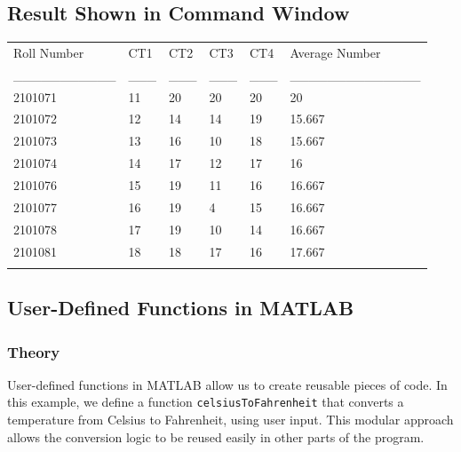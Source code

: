 \documentclass[a4paper,12pt]{article}
\begin{document}
\subsection{Result Shown in Command Window}
\begin{table}[H]
	\centering
	\begin{tabular}{llllll}
		Roll Number            & CT1    & CT2    & CT3    & CT4    & Average Number               \\
		\_\_\_\_\_\_\_\_\_\_\_ & \_\_\_ & \_\_\_ & \_\_\_ & \_\_\_ & \_\_\_\_\_\_\_\_\_\_\_\_\_\_ \\
		2101071                & 11     & 20     & 20     & 20     & 20                           \\
		2101072                & 12     & 14     & 14     & 19     & 15.667                       \\
		2101073                & 13     & 16     & 10     & 18     & 15.667                       \\
		2101074                & 14     & 17     & 12     & 17     & 16                           \\
		2101076                & 15     & 19     & 11     & 16     & 16.667                       \\
		2101077                & 16     & 19     & 4      & 15     & 16.667                       \\
		2101078                & 17     & 19     & 10     & 14     & 16.667                       \\
		2101081                & 18     & 18     & 17     & 16     & 17.667                       \\
		&        &        &        &        &                             
	\end{tabular}
\end{table}
\subsection{User-Defined Functions in MATLAB}

\subsubsection*{Theory}
User-defined functions in MATLAB allow us to create reusable pieces of code. In this example, we define a function \texttt{celsiusToFahrenheit} that converts a temperature from Celsius to Fahrenheit, using user input. This modular approach allows the conversion logic to be reused easily in other parts of the program.
\end{document}
